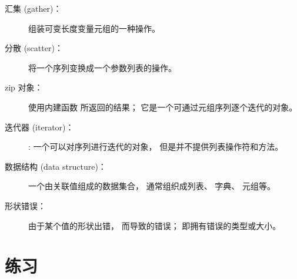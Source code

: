 {\begin{description}
\item[汇集 (gather)：] 组装可变长度变量元组的一种操作。


\item[分散 (scatter)：] 将一个序列变换成一个参数列表的操作。



\item[zip 对象：] 使用内建函数  所返回的结果； 它是一个可通过元组序列逐个迭代的对象。
 


\item[迭代器 (iterator)：]: 一个可以对序列进行迭代的对象， 但是并不提供列表操作符和方法。


\item[数据结构 (data structure)：] 一个由关联值组成的数据集合， 通常组织成列表、 字典、 元组等。


\item[形状错误：] 由于某个值的形状出错， 而导致的错误； 即拥有错误的类型或大小。

\end{description}



\section{练习}

}
